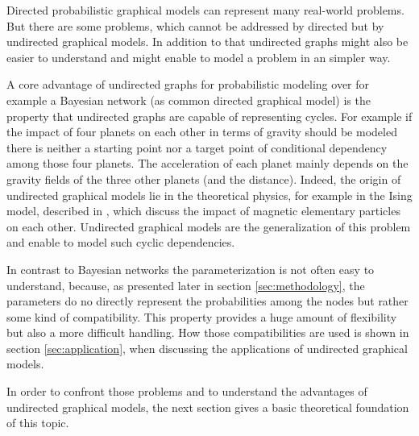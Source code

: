 

Directed probabilistic graphical models can represent many real-world problems. But there are some problems, which cannot be addressed by directed but by undirected graphical models. In addition to that undirected graphs might also be easier to understand and might enable to model a problem in an simpler way.

A core advantage of undirected graphs for probabilistic modeling over for example a Bayesian network (as common directed graphical model) is the property that undirected graphs are capable of representing cycles. For example if the impact of four planets on each other in terms of gravity should be modeled there is neither a starting point nor a target point of conditional dependency among those four planets. The acceleration of each planet mainly depends on the gravity fields of the three other planets (and the distance). Indeed, the origin of undirected graphical models lie in the theoretical physics, for example in the Ising model, described in \cite{ising1925beitrag}, which discuss the impact of magnetic elementary particles on each other. Undirected graphical models are the generalization of this problem and enable to model such cyclic dependencies.

In contrast to Bayesian networks the parameterization is not often easy to understand, because, as presented later in section \ref{sec:methodology}, the parameters do no directly represent the probabilities among the nodes but rather some kind of compatibility. This property provides a huge amount of flexibility but also a more difficult handling. How those compatibilities are used is shown in section \ref{sec:application}, when discussing the applications of undirected graphical models. 

In order to confront those problems and to understand the advantages of undirected graphical models, the next section gives a basic theoretical foundation of this topic.
